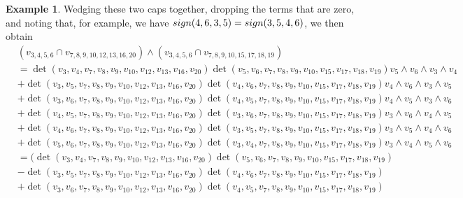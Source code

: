 \documentclass[10pt]{amsart}
\theoremstyle{definition}
\theoremstyle{plain}
\theoremstyle{plain}
\theoremstyle{definition}
\newtheorem{example}[cdrthm]{Example}
\theoremstyle{remark}
\theoremstyle{plain}
\theoremstyle{plain}
\theoremstyle{plain}
\numberwithin{equation}{section}
\begin{document}
\begin{example}
Wedging these two caps together, dropping the terms that are zero, and noting that, for example, we have ${\rm sign}(4,6,3,5)={\rm sign}(3,5,4,6)$, we then obtain
{\tiny 
\begin{align*}
    &(v_{{3},{4},{5},{6}} \cap v_{7, 8, 9, 10, 12,13,16,{20}}) \wedge (v_{3,4,5,6} \cap v_{7,8,9,10, 15, 17, 18, 19})   \\
     &=\det\left(v_{3},v_{4}, v_{7}, v_{8}, v_{9}, v_{10}, v_{12}, v_{13}, v_{16}, v_{20}\right)  \det\left(v_{5},v_{6},v_7,v_8,v_9,v_{10},v_{15}, v_{17}, v_{18}, v_{19}\right) v_{5} \wedge v_{6} \wedge v_{3} \wedge v_{4}\nonumber \\
     &+ \det\left(v_{3},v_{5},v_{7}, v_{8}, v_{9}, v_{10}, v_{12}, v_{13}, v_{16}, v_{20}\right) \det\left(v_{4},v_{6},v_7,v_8,v_9,v_{10},v_{15}, v_{17}, v_{18}, v_{19}\right) v_{4} \wedge v_{6} \wedge v_{3} \wedge v_{5} \nonumber \\
     &+\det\left(v_{3},v_{6},v_{7}, v_{8}, v_{9}, v_{10}, v_{12}, v_{13}, v_{16}, v_{20}\right) \det\left(v_{4},v_{5},v_7,v_8,v_9,v_{10},v_{15}, v_{17}, v_{18}, v_{19}\right) v_{4} \wedge v_{5} \wedge v_{3} \wedge v_{6} \nonumber \\
     &+ \det\left(v_{4},v_{5},v_{7}, v_{8}, v_{9}, v_{10}, v_{12}, v_{13}, v_{16}, v_{20}\right) \det\left(v_{3},v_{6},v_7,v_8,v_9,v_{10},v_{15}, v_{17}, v_{18}, v_{19}\right) v_{3} \wedge v_{6} \wedge v_{4} \wedge v_{5} \nonumber \\
     &+ \det\left(v_{4},v_{6},v_{7}, v_{8}, v_{9}, v_{10}, v_{12}, v_{13}, v_{16}, v_{20}\right) \det\left(v_{3},v_{5},v_7,v_8,v_9,v_{10},v_{15}, v_{17}, v_{18}, v_{19}\right) v_{3} \wedge v_{5}\wedge v_{4} \wedge v_{6} \nonumber \\
     &+\det\left(v_{5},v_{6},v_{7}, v_{8}, v_{9}, v_{10}, v_{12}, v_{13}, v_{16}, v_{20}\right) \det\left(v_{3},v_{4},v_7,v_8,v_9,v_{10},v_{15}, v_{17}, v_{18}, v_{19}\right) v_{3} \wedge v_{4} \wedge v_{5} \wedge v_{6} \nonumber \\
     &= \Bigg( \det\left(v_{3},v_{4}, v_{7}, v_{8}, v_{9}, v_{10}, v_{12}, v_{13}, v_{16}, v_{20}\right)  \det\left(v_{5},v_{6},v_7,v_8,v_9,v_{10},v_{15}, v_{17}, v_{18}, v_{19}\right) \nonumber \\
     &- \det\left(v_{3},v_{5},v_{7}, v_{8}, v_{9}, v_{10}, v_{12}, v_{13}, v_{16}, v_{20}\right) \det\left(v_{4},v_{6},v_7,v_8,v_9,v_{10},v_{15}, v_{17}, v_{18}, v_{19}\right) \nonumber \\
     &+ \det\left(v_{3},v_{6},v_{7}, v_{8}, v_{9}, v_{10}, v_{12}, v_{13}, v_{16}, v_{20}\right) \det\left(v_{4},v_{5},v_7,v_8,v_9,v_{10},v_{15}, v_{17}, v_{18}, v_{19}\right) \nonumber \\

\end{align*}}
\end{example}
\end{document}

